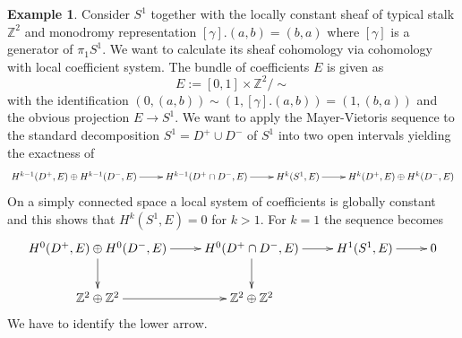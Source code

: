 \documentclass[10pt]{amsart}
\theoremstyle{definition}
\newtheorem{ex}[defn]{Example}
\theoremstyle{plain}
\theoremstyle{remark}
\newcommand{\ZZ}{\mathbb{Z}}
\newcommand{\union}{\cup}
\newcommand{\intersection}{\cap}
\begin{document}
\begin{ex}\label{twistarsch}
Consider $S^1$ together with the locally constant sheaf of typical stalk $\ZZ^2$ and monodromy representation $[\gamma].(a,b)=(b,a)$ where $[\gamma]$ is a generator of $\pi_1S^1$. We want to calculate its sheaf cohomology via cohomology with local coefficient system. The bundle of coefficients $E$ is given as $$E:=[0,1]\times\ZZ^2/\sim$$ with the identification $(0,(a,b))\sim (1,[\gamma].(a,b))=(1,(b,a))$ and the obvious projection $E\to S^1$. We want to apply the Mayer-Vietoris sequence to the standard decomposition $S^1=D^+\union D^-$ of $S^1$ into two open intervals yielding the exactness of
\[\begin{xy}
  \xymatrix{
  H^{k-1}(D^+,E)\oplus H^{k-1}(D^-,E)\ar[r] & H^{k-1}(D^+\intersection D^-,E)\ar[r] & H^k(S^1,E)\ar[r] & H^k(D^+,E)\oplus H^k(D^-,E)
  } 
  \end{xy}\]
On a simply connected space a local system of coefficients is globally constant and this shows that $H^k(S^1,E)=0$ for $k>1$. For $k=1$ the sequence becomes
\begin{align}\label{arsch}
\begin{xy}
  \xymatrix{
  H^0(D^+,E)\oplus H^0(D^-,E)\ar[r]\ar[d] & H^0(D^+\intersection D^-,E)\ar[r]\ar[d] & H^1(S^1,E)\ar[r] & 0\\
  \ZZ^2\oplus\ZZ^2\ar[r] & \ZZ^2\oplus\ZZ^2 & &
  }
  \end{xy}
\end{align}
We have to identify the lower arrow.\newline
{}
\end{ex}
\end{document}
